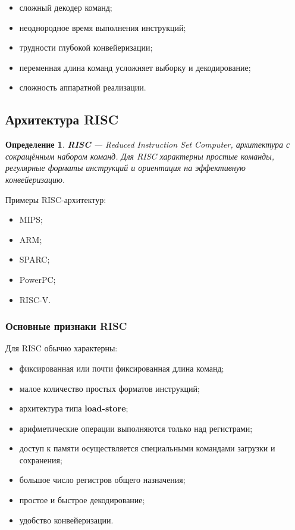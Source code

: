 \documentclass[12pt,a4paper]{article}
\newtheorem{definition}{Определение}
\begin{document}
\begin{itemize}
    \item сложный декодер команд;
    \item неоднородное время выполнения инструкций;
    \item трудности глубокой конвейеризации;
    \item переменная длина команд усложняет выборку и декодирование;
    \item сложность аппаратной реализации.
\end{itemize}

\subsection{Архитектура RISC}

\begin{definition}
\textbf{RISC} --- Reduced Instruction Set Computer, архитектура с сокращённым набором команд. Для RISC характерны простые команды, регулярные форматы инструкций и ориентация на эффективную конвейеризацию.
\end{definition}

Примеры RISC-архитектур:

\begin{itemize}
    \item MIPS;
    \item ARM;
    \item SPARC;
    \item PowerPC;
    \item RISC-V.
\end{itemize}

\subsubsection{Основные признаки RISC}

Для RISC обычно характерны:

\begin{itemize}
    \item фиксированная или почти фиксированная длина команд;
    \item малое количество простых форматов инструкций;
    \item архитектура типа \textbf{load-store};
    \item арифметические операции выполняются только над регистрами;
    \item доступ к памяти осуществляется специальными командами загрузки и сохранения;
    \item большое число регистров общего назначения;
    \item простое и быстрое декодирование;
    \item удобство конвейеризации.
\end{itemize}
\end{document}
